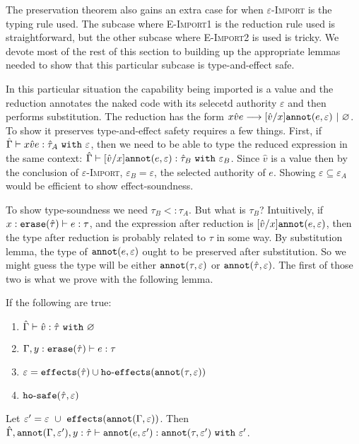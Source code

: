 The preservation theorem also gains an extra case for when \textsc{$\varepsilon$-Import} is the typing rule used. The subcase where \textsc{E-Import1} is the reduction rule used is straightforward, but the other subcase where \textsc{E-Import2} is used is tricky. We devote most of the rest of this section to building up the appropriate lemmas needed to show that this particular subcase is type-and-effect safe.

In this particular situation the capability being imported is a value and the reduction annotates the naked code with its selecetd authority $\varepsilon$ and then performs substitution. The reduction has the form ${x}{\hat v}{e} \longrightarrow [\hat v/x]\mathtt{annot}(e, \varepsilon)~|~\varnothing$. To show it preserves type-and-effect safety requires a few things. First, if $\hat \Gamma \vdash {x}{\hat v}{e}: \hat \tau_A~\mathtt{with}~ \varepsilon$, then we need to be able to type the reduced expression in the same context: $\hat \Gamma \vdash [\hat v/x]\mathtt{annot}(e, \varepsilon): \hat \tau_B~\mathtt{with}~ \varepsilon_B$. Since $\hat v$ is a value then by the conclusion of \textsc{$\varepsilon$-Import}, $\varepsilon_B = \varepsilon$, the selected authority of $e$. Showing $\varepsilon \subseteq \varepsilon_A$ would be efficient to show effect-soundness.

To show type-soundness we need $\tau_B <: \tau_A$. But what is $\tau_B$? Intuitively, if $x: \mathtt{erase}(\hat \tau) \vdash e: \tau$, and the expression after reduction is $[\hat v/x]\mathtt{annot}(e, \varepsilon)$, then the type after reduction is probably related to $\tau$ in some way. By substitution lemma, the type of $\mathtt{annot}(e, \varepsilon)$ ought to be preserved after substitution. So we might guess the type will be either $\mathtt{annot}(\tau, \varepsilon)$ or $\mathtt{annot}(\hat \tau, \varepsilon)$. The first of those two is what we prove with the following lemma.

\begin{lemma}[Annotation]
If the following are true:

\begin{enumerate}
	\setlength\itemsep{-0.7em}
	\item $\hat \Gamma \vdash \hat v : \hat \tau~\mathtt{with}~ \varnothing$
	\item $\Gamma, y: \mathtt{erase}(\hat \tau) \vdash e: \tau$
	\item $\varepsilon = \mathtt{effects}(\hat \tau) \cup \mathtt{ho \hbox{-} effects}(\mathtt{annot}(\tau, \varepsilon))$
	\item $\mathtt{ho \hbox{-} safe}(\hat \tau, \varepsilon)$
\end{enumerate}

\noindent
Let $\varepsilon' = \varepsilon~\cup~ \mathtt{effects}(\mathtt{annot}(\Gamma, \varepsilon))$. Then $\hat \Gamma, \mathtt{annot}(\Gamma, \varepsilon'), y: \hat \tau \vdash \mathtt{annot}(e, \varepsilon') : \mathtt{annot}(\tau, \varepsilon')~\mathtt{with}~ \varepsilon'$.
\end{lemma}

